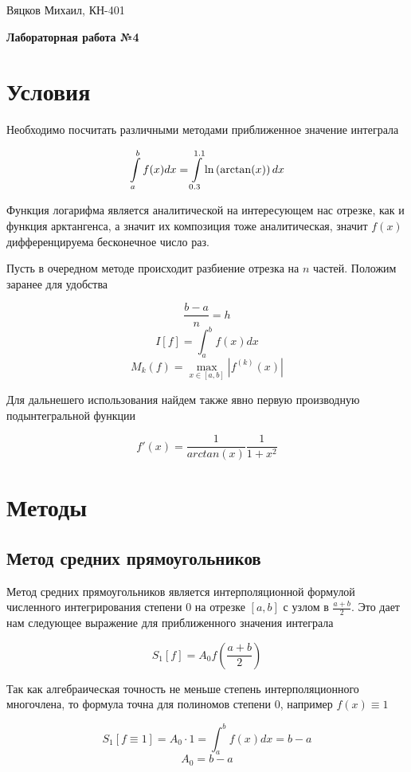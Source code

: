 \documentclass[11pt,a4paper,oneside]{article}
\begin{document}
\begin{center}
	{Вяцков Михаил, КН-401}
	
	{\huge \bf Лабораторная работа №4}
\end{center}

\section{Условия}

Необходимо посчитать различными методами приближенное значение интеграла

$$ \int\displaylimits_{a}^{b} f(x) dx
	= \int\displaylimits_{0.3}^{1.1} \ln \left( \arctan(x) \right) dx $$

Функция логарифма является аналитической на интересующем нас отрезке, как и функция арктангенса, а значит их композиция тоже аналитическая, значит $f(x)$ дифференцируема бесконечное число раз.

Пусть в очередном методе происходит разбиение отрезка на $n$ частей. Положим заранее для удобства

$$ \frac{b - a}{n} = h $$
$$ I[f] = \int_{a}^{b} f(x) dx $$
$$ M_k(f) = \max_{x \in [a, b]} \left| f^{(k)}(x) \right| $$

Для дальнешего использования найдем также явно первую производную подынтегральной функции

$$ f'(x) = \frac{1}{arctan(x)} \frac{1}{1 + x^2} $$

\section{Методы}

\subsection{Метод средних прямоугольников}

Метод средних прямоугольников является интерполяционной формулой численного интегрирования степени $0$ на отрезке $[a, b]$ с узлом в $\frac{a + b}{2}$. Это дает нам следующее выражение для приближенного значения интеграла

$$ S_1[f] = A_0 f \left( \frac{a + b}{2} \right) $$

Так как алгебраическая точность не меньше степень интерполяционного многочлена, то формула точна для полиномов степени $0$, например $f(x) \equiv 1$

$$ S_1[f \equiv 1] = A_0 \cdot 1 = \int_{a}^{b} f(x) dx = b - a $$
$$ A_0 = b - a $$
\end{document}
